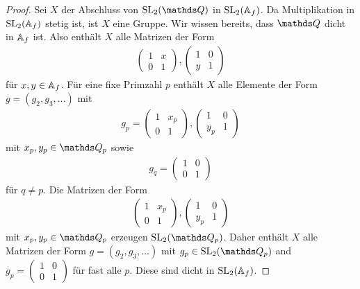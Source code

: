 \begin{proof}
Sei $X$ der Abschluss von $\SL_2(\Q)$ in $\operatorname{SL}_2(\mathbb{A}_f)$.
Da Multiplikation in $\operatorname{SL}_2(\mathbb{A}_f)$ stetig ist, ist $X$ eine Gruppe.
Wir wissen bereits, dass $\Q$ dicht in $\mathbb{A}_f$ ist.
Also enthält $X$ alle Matrizen der Form
\begin{align*}
\begin{pmatrix}
1&x\\
0&1
\end{pmatrix},\begin{pmatrix}
1&0\\
y&1
\end{pmatrix}
\end{align*}
für $x,y\in \mathbb{A}_f$.
Für eine fixe Primzahl $p$ enthält $X$ alle Elemente der Form $g=(g_2,g_3,\dots)$
mit
\begin{align*}
g_p=\begin{pmatrix}
1&x_p\\
0&1
\end{pmatrix},\begin{pmatrix}
1&0\\
y_p&1
\end{pmatrix}
\end{align*}
mit $x_p,y_p \in \Q_p$
sowie
\begin{align*}
g_q=\begin{pmatrix}
1&0\\
0&1
\end{pmatrix}
\end{align*}
für $q\not =p$.
Die Matrizen der Form
\begin{align*}
\begin{pmatrix}
1&x_p\\
0&1
\end{pmatrix},\begin{pmatrix}
1&0\\
y_p&1
\end{pmatrix}
\end{align*}
mit $x_p,y_p \in \Q_p$ erzeugen $\SL_2(\Q_p)$.
Daher enthält $X$ alle Matrizen der Form $g=(g_2,g_3,\dots)$ mit $g_p \in \SL_2(\Q_p)$ and $g_p=\begin{pmatrix}
1&0\\
0&1
\end{pmatrix}$ für fast alle $p$.
Diese sind dicht in $\operatorname{SL}_2(\mathbb{A}_f)$.
\end{proof}

